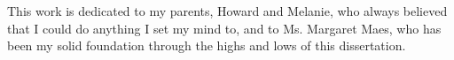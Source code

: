 

This work is dedicated to my parents, Howard and Melanie, who always believed
that I could do anything I set my mind to, and to Ms. Margaret Maes, who has
been my solid foundation through the highs and lows of this dissertation.
